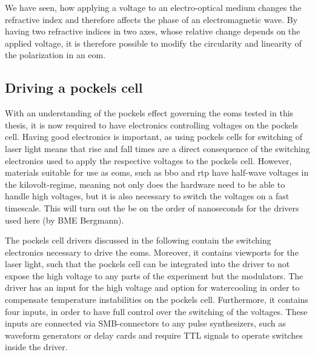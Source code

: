 We have seen, how applying a voltage to an electro-optical medium changes the refractive index and therefore affects the phase of an electromagnetic wave. By having two refractive indices in two axes, whose relative change depends on the applied voltage, it is therefore possible to modify the circularity and linearity of the polarization in an \acl{eom}.

\subsection{Driving a pockels cell}

With an understanding of the pockels effect governing the \acp{eom} tested in this thesis, it is now required to have electronics controlling voltages on the pockels cell. Having good electronics is important, as using pockels cells for switching of laser light means that rise and fall times are a direct consequence of the switching electronics used to apply the respective voltages to the pockels cell. However, materials suitable for use as \acp{eom}, such as \ac{bbo} and \ac{rtp} have half-wave voltages in the kilovolt-regime, meaning not only does the hardware need to be able to handle high voltages, but it is also necessary to switch the voltages on a fast timescale. This will turn out the be on the order of nanoseconds for the drivers used here (by BME Bergmann).


The pockels cell drivers discussed in the following contain the switching electronics necessary to drive the \acp{eom}. Moreover, it contains viewports for the laser light, such that the pockels cell can be integrated into the driver to not expose the high voltage to any parts of the experiment but the modulators. The driver has an input for the high voltage and option for watercooling in order to compensate temperature instabilities on the pockels cell. Furthermore, it contains four inputs, in order to have full control over the switching of the voltages. These inputs are connected via SMB-connectors to any pulse synthesizers, such as waveform generators or delay cards and require TTL signals to operate switches inside the driver.

